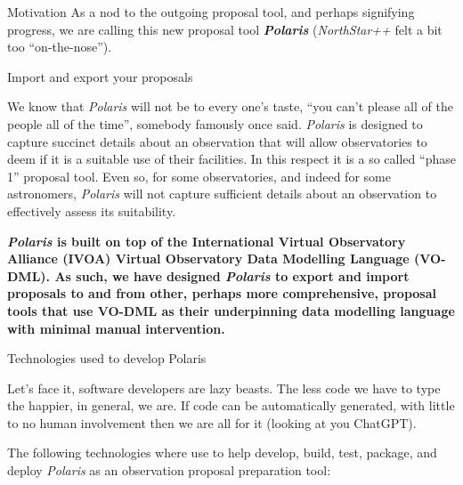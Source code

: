 \documentclass[final]{beamer}
\newlength{\colwidth}
\begin{document}
\begin{frame}[t]
\begin{columns}[t]
\begin{column}{\colwidth}
\begin{block}{Motivation}
                    As a nod to the outgoing proposal tool, and perhaps signifying progress, we are calling this new
                    proposal tool \textbf{\emph{Polaris}} (\emph{NorthStar++} felt a bit too ``on-the-nose'').

                \end{block}

                \begin{alertblock}{Import and export your proposals}

                    We know that \emph{Polaris} will not be to every one's taste,
                    ``you can't please all of the people all of the time'', somebody famously once said.
                    \emph{Polaris} is designed to capture succinct details about an observation
                    that will allow observatories to deem if it is a suitable use of their facilities.
                    In this respect it is a so called ``phase 1'' proposal tool.
                    Even so, for some observatories, and indeed for some astronomers, \emph{Polaris} will not
                    capture sufficient details about an observation to effectively assess its suitability.

                    \textbf{\emph{Polaris} is built on top of the International Virtual Observatory Alliance (IVOA)
                        Virtual Observatory Data Modelling Language (VO-DML).
                        As such, we have designed \emph{Polaris} to export and import proposals to and from other,
                        perhaps more comprehensive, proposal tools that use VO-DML as their underpinning data modelling
                        language with minimal manual intervention.
                    }

                \end{alertblock}

                \begin{block}{Technologies used to develop Polaris}

                    Let's face it, software developers are lazy beasts.
                    The less code we have to type the happier, in general, we are.
                    If code can be automatically generated, with little to no human involvement then we are
                    all for it (looking at you ChatGPT).

                    The following technologies where use to help develop, build, test, package, and deploy
                    \emph{Polaris} as an observation proposal preparation tool:


\end{block}
\end{column}
\end{columns}
\end{frame}
\end{document}
